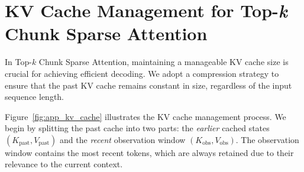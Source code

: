 \begin{table}[htbp]
\centering
\caption{Comparison of Sparse and Full Attention on Latency and Memory Usage}
\label{tab:attention-comparison}
\end{table}


\section{KV Cache Management for Top-\textit{k} Chunk Sparse Attention}
\label{sec:kv_cache}


In Top-$k$ Chunk Sparse Attention, maintaining a manageable KV cache size is crucial for achieving efficient decoding. 
We adopt a compression strategy to ensure that the past KV cache remains constant in size, regardless of the input sequence length.

Figure~\ref{fig:app_kv_cache} illustrates the KV cache management process. 
We begin by splitting the past cache into two parts: the \textit{earlier} cached states $(K_{\text{past}}, V_{\text{past}})$ and the \textit{recent} observation window $(K_{\text{obs}}, V_{\text{obs}})$. The observation window contains the most recent tokens, which are always retained due to their relevance to the current context.

